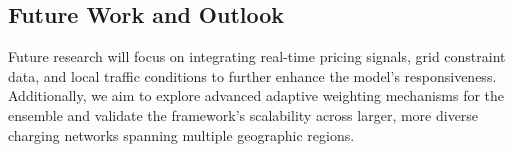 \documentclass[journal]{IEEEtran}
\begin{document}
\subsection{Future Work and Outlook}
Future research will focus on integrating real-time pricing signals, grid constraint data, and local traffic conditions to further enhance the model's responsiveness. Additionally, we aim to explore advanced adaptive weighting mechanisms for the ensemble and validate the framework's scalability across larger, more diverse charging networks spanning multiple geographic regions.
\end{document}
